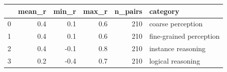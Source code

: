 \begin{tabular}{lrrrrl}
\toprule
 & mean_r & min_r & max_r & n_pairs & category \\
\midrule
0 & 0.4 & 0.1 & 0.6 & 210 & coarse perception \\
1 & 0.4 & 0.1 & 0.6 & 210 & fine-grained perception \\
2 & 0.4 & -0.1 & 0.8 & 210 & instance reasoning \\
3 & 0.2 & -0.4 & 0.7 & 210 & logical reasoning \\
\bottomrule
\end{tabular}
